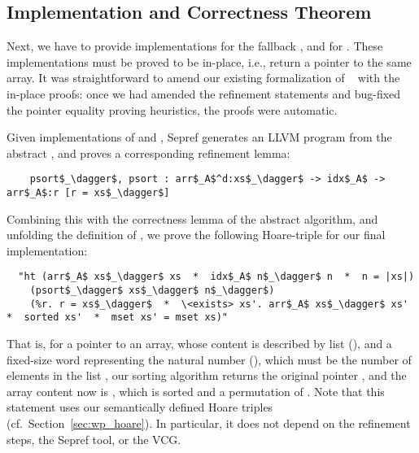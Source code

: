 \documentclass[sn-mathphys,Numbered]{sn-jnl}
\theoremstyle{thmstyleone}%
\theoremstyle{definition}%
\theoremstyle{thmstylethree}%
\begin{document}
  \subsection{Implementation and Correctness Theorem}\label{sec:impl_corr}
  Next, we have to provide implementations for the fallback , and for .
  These implementations must be proved to be in-place, i.e., return a pointer to the same array.
  It was straightforward to amend our existing formalization of ~\cite{La20} with the in-place proofs:
  once we had amended the refinement statements and bug-fixed the pointer equality proving heuristics,
  the proofs were automatic.

  Given implementations of  and , Sepref
  generates an LLVM program  from the abstract , and proves a corresponding refinement lemma:
  \begin{lstlisting}
    psort$_\dagger$, psort : arr$_A$^d:xs$_\dagger$ -> idx$_A$ -> arr$_A$:r [r = xs$_\dagger$]
  \end{lstlisting}
  Combining this with the correctness lemma of the abstract  algorithm, and unfolding the definition of ,
  we prove the following Hoare-triple for our final implementation:
  \begin{lstlisting}
  "ht (arr$_A$ xs$_\dagger$ xs  *  idx$_A$ n$_\dagger$ n  *  n = |xs|)
    (psort$_\dagger$ xs$_\dagger$ n$_\dagger$)
    (%r. r = xs$_\dagger$  *  \<exists> xs'. arr$_A$ xs$_\dagger$ xs'  *  sorted xs'  *  mset xs' = mset xs)"
  \end{lstlisting}
  That is, for a pointer  to an array, whose content is described by list  (), and a fixed-size word  representing the natural number  (),
  which must be the number of elements in the list , our sorting algorithm returns the original pointer , and the array content now is , which is sorted and a permutation of .
  Note that this statement uses our semantically defined Hoare triples (cf.\ Section~\ref{sec:wp_hoare}).
  In particular, it does not depend on the refinement steps, the Sepref tool, or the VCG.
\end{document}

